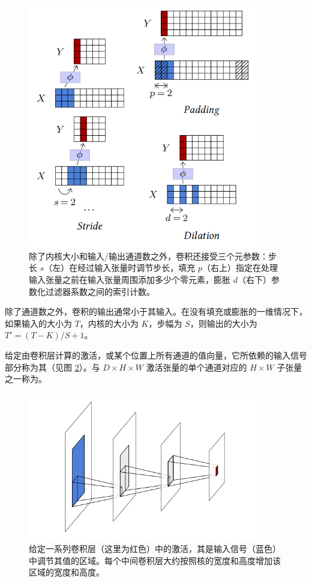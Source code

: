 \begin{figure}
    \centering
    \includegraphics[width=0.9\textwidth]{fig/fig4.3.png}
    \caption[步长、填充和膨胀]{除了内核大小和输入/输出通道数之外，卷积还接受三个元参数：步长 $s$（左）在经过输入张量时调节步长，填充 $p$（右上）指定在处理输入张量之前在输入张量周围添加多少个零元素，膨胀 $d$（右下）参数化过滤器系数之间的索引计数。}
    \label{fig4.3}
\end{figure}

除了通道数之外，卷积的输出通常小于其输入。在没有填充或膨胀的一维情况下，如果输入的大小为 $T$，内核的大小为 $K$，步幅为 $S$，则输出的大小为 $T' = (T - K)/S + 1$。

\newpage

给定由卷积层计算的激活，或某个位置上所有通道的值向量，它所依赖的输入信号部分称为其（见图 \ref{fig4.4}）。与 $D \times H \times W$ 激活张量的单个通道对应的 $H \times W$ 子张量之一称为。

\begin{figure}
    \centering
    \includegraphics[width=0.9\textwidth]{fig/fig4.4.png}
    \caption[感受野]{给定一系列卷积层（这里为红色）中的激活，其是输入信号（蓝色）中调节其值的区域。每个中间卷积层大约按照核的宽度和高度增加该区域的宽度和高度。}
    \label{fig4.4}
\end{figure}

